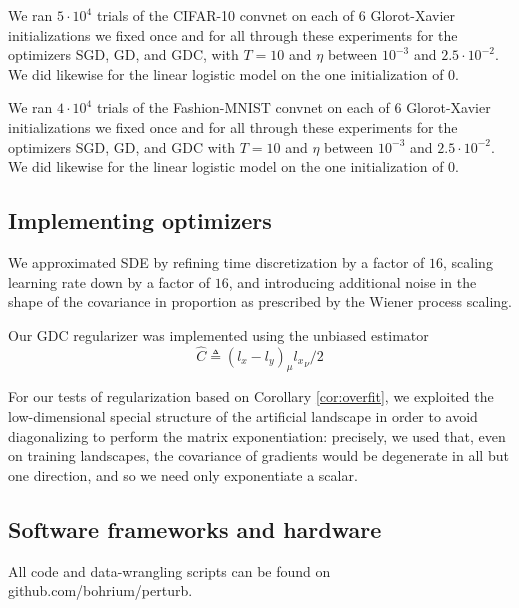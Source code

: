 \documentclass[openany, notitlepage, justified]{tufte-book}
\theoremstyle{plain}
\theoremstyle{definition}
\begin{document}
            We ran $5 \cdot 10^4$ trials of the CIFAR-10 convnet on each of $6$
            Glorot-Xavier initializations we fixed once and for all through
            these experiments for the optimizers SGD, GD, and GDC, with $T=10$
            and $\eta$ between $10^{-3}$ and $2.5 \cdot 10^{-2}$.  We did
            likewise for the linear logistic model on the one initialization of
            $0$.

            We ran $4 \cdot 10^4$ trials of the Fashion-MNIST convnet on each
            of $6$ Glorot-Xavier initializations we fixed once and for all
            through these experiments for the optimizers SGD, GD, and GDC with
            $T=10$ and $\eta$ between $10^{-3}$ and $2.5 \cdot 10^{-2}$.  We
            did likewise for the linear logistic model on the one
            initialization of $0$. 

        \subsection{Implementing optimizers}                            \label{appendix:optimizers}

            We approximated SDE by refining time discretization by a factor of
            $16$, scaling learning rate down by a factor of $16$, and introducing
            additional noise in the shape of the covariance in proportion as
            prescribed by the Wiener process scaling.

            Our GDC regularizer was implemented using the unbiased estimator
            $$
                \hat{C} \triangleq (l_x - l_y)_\mu {l_x}_\nu / 2
            $$
            
            For our tests of regularization based on Corollary \ref{cor:overfit},
            we exploited the low-dimensional special structure of the artificial
            landscape in order to avoid diagonalizing to perform the matrix
            exponentiation: precisely, we used that, even on training landscapes,
            the covariance of gradients would be degenerate in all but one
            direction, and so we need only exponentiate a scalar.

        \subsection{Software frameworks and hardware}                   \label{appendix:frameworks}

            All code and data-wrangling scripts can be found on
            {\color{mooteal}github.com/bohrium/perturb}.
\end{document}
